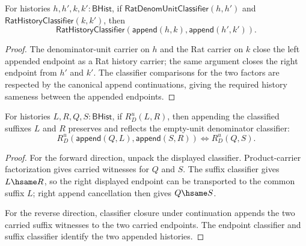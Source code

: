 \begin{theorem}
\label{thm:rat-history-classifier-append-left-denom-unit-closed}
For histories $h,h',k,k':\mathsf{BHist}$, if
$\mathsf{RatDenomUnitClassifier}(h,h')$ and
$\mathsf{RatHistoryClassifier}(k,k')$, then
$$
\mathsf{RatHistoryClassifier}(\mathsf{append}(h,k),\mathsf{append}(h',k')).
$$
\end{theorem}
\begin{proof}
The denominator-unit carrier on $h$ and the Rat carrier on $k$ close the left
appended endpoint as a Rat history carrier; the same argument closes the right
endpoint from $h'$ and $k'$. The classifier comparisons for the two factors
are respected by the canonical append continuations, giving the required
history sameness between the appended endpoints.
\end{proof}

\begin{theorem}
\label{thm:rat-denom-unit-classifier-append-context-cancel}
For histories $L,R,Q,S:\mathsf{BHist}$, if $R_D^u(L,R)$, then appending the
classified suffixes $L$ and $R$ preserves and reflects the empty-unit
denominator classifier:
$$
R_D^u(\mathsf{append}(Q,L),\mathsf{append}(S,R))
\Longleftrightarrow R_D^u(Q,S).
$$
\end{theorem}
\begin{proof}
For the forward direction, unpack the displayed classifier. Product-carrier
factorization gives carried witnesses for $Q$ and $S$. The suffix classifier
gives $L\hsame R$, so the right displayed endpoint can be transported to the
common suffix $L$; right append cancellation then gives $Q\hsame S$.

For the reverse direction, classifier closure under continuation appends the
two carried suffix witnesses to the two carried endpoints. The endpoint
classifier and suffix classifier identify the two appended histories.
\end{proof}

